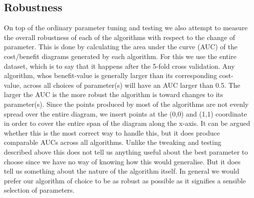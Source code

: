 \subsection{Robustness}\label{sec:robustness}
%
On top of the ordinary parameter tuning and testing we also attempt to measure the overall robustness of each of the algorithms with respect to the change of parameter. This is done by calculating the area under the curve (AUC) of the cost/benefit diagrams generated by each algorithm. For this we use the entire dataset, which is to say that it happens after the 5-fold cross validation. Any algorithm, whos benefit-value is generally larger than its corresponding cost-value, across all choices of parameter(s) will have an AUC larger than 0.5. The larger the AUC is the more robust the algorithm is toward changes to its parameter(s). Since the points produced by most of the algorithms are not evenly spread over the entire diagram, we insert points at the (0,0) and (1,1) coordinate in order to cover the entire span of the diagram along the x-axis. It can be argued whether this is the most correct way to handle this, but it does produce comparable AUCs across all algorithms. Unlike the tweaking and testing described above this does not tell us anything useful about the best parameter to choose since we have no way of knowing how this would generalise. But it does tell us something about the nature of the algorithm itself. In general we would prefer our algorithm of choice to be as robust as possible as it signifies a sensible selection of parameters. 
%
